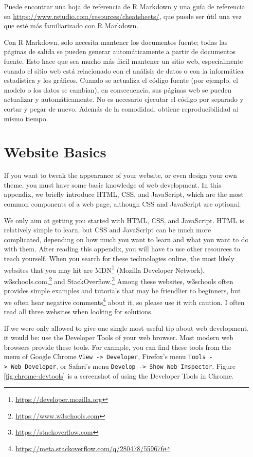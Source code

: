 \documentclass[12pt,]{krantz}
\renewcommand{\href}[2]{#2\footnote{\url{#1}}}
\theoremstyle{definition}
\theoremstyle{definition}
\theoremstyle{definition}
\theoremstyle{remark}
\begin{document}
Puede encontrar una hoja de referencia de R Markdown y una guía de
referencia en \url{https://www.rstudio.com/resources/cheatsheets/}, que
puede ser útil una vez que esté más familiarizado con R Markdown.

Con R Markdown, solo necesita mantener los documentos fuente; todas las
páginas de salida se pueden generar automáticamente a partir de
documentos fuente. Esto hace que sea mucho más fácil mantener un sitio
web, especialmente cuando el sitio web está relacionado con el análisis
de datos o con la informática estadística y los gráficos. Cuando se
actualiza el código fuente (por ejemplo, el modelo o los datos se
cambian), en consecuencia, sus páginas web se pueden actualizar y
automáticamente. No es necesario ejecutar el código por separado y
cortar y pegar de nuevo. Además de la comodidad, obtiene
reproducibilidad al mismo tiempo.

\hypertarget{website-basics}{%
\chapter{Website Basics}\label{website-basics}}

If you want to tweak the appearance of your website, or even design your
own theme, you must have some basic knowledge of web development. In
this appendix, we briefly introduce HTML, CSS, and JavaScript, which are
the most common components of a web page, although CSS and JavaScript
are optional.

We only aim at getting you started with HTML, CSS, and JavaScript. HTML
is relatively simple to learn, but CSS and JavaScript can be much more
complicated, depending on how much you want to learn and what you want
to do with them. After reading this appendix, you will have to use other
resources to teach yourself. When you search for these technologies
online, the most likely websites that you may hit are
\href{https://developer.mozilla.org}{MDN} (Mozilla Developer Network),
\href{https://www.w3schools.com}{w3schools.com,} and
\href{https://stackoverflow.com}{StackOverflow.} Among these websites,
w3schools often provides simple examples and tutorials that may be
friendlier to beginners, but we often hear
\href{https://meta.stackoverflow.com/q/280478/559676}{negative comments}
about it, so please use it with caution. I often read all three websites
when looking for solutions.

If we were only allowed to give one single most useful tip about web
development, it would be: use the Developer Tools of your web browser.
Most modern web browsers provide these tools. For example, you can find
these tools from the menu of Google Chrome
\texttt{View\ -\textgreater{}\ Developer}, Firefox's menu
\texttt{Tools\ -\textgreater{}\ Web\ Developer}, or Safari's menu
\texttt{Develop\ -\textgreater{}\ Show\ Web\ Inspector}. Figure
\ref{fig:chrome-devtools} is a screenshot of using the Developer Tools
in Chrome.
\end{document}
